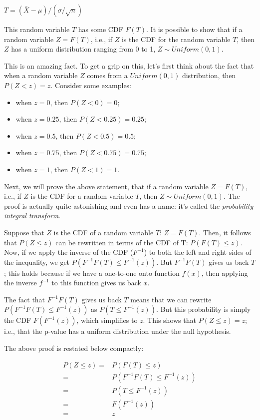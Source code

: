 \documentclass[12pt,]{krantz}
\providecommand{\tightlist}{%
  \setlength{\itemsep}{0pt}\setlength{\parskip}{0pt}}
\begin{document}
\(T=(\bar{X}-\mu)/(\sigma/\sqrt{n})\)

This random variable \(T\) has some CDF \(F(T)\). It is possible to show that if a random variable \(Z=F(T)\), i.e., if \(Z\) is the
CDF for the random variable \(T\), then \(Z\) has a uniform distribution ranging from 0 to 1, \(Z \sim Uniform(0,1)\).

This is an amazing fact. To get a grip on this, let's first think about the fact that when a random variable \(Z\) comes from a \(Uniform(0,1)\) distribution, then \(P(Z<z)=z\). Consider some examples:

\begin{itemize}
\tightlist
\item
  when \(z=0\), then \(P(Z<0)=0\);
\item
  when \(z=0.25\), then \(P(Z<0.25)=0.25\);
\item
  when \(z=0.5\), then \(P(Z<0.5)=0.5\);
\item
  when \(z=0.75\), then \(P(Z<0.75)=0.75\);
\item
  when \(z=1\), then \(P(Z<1)=1\).
\end{itemize}

Next, we will prove the above statement, that if a random variable \(Z=F(T)\), i.e., if \(Z\) is the
CDF for a random variable \(T\), then \(Z \sim Uniform(0,1)\).
The proof is actually quite astonishing and even has a name: it's called the \emph{probability integral transform}.

Suppose that \(Z\) is the CDF of a random variable \(T\): \(Z=F(T)\). Then, it follows that \(P(Z\leq z)\) can be rewritten in terms of the CDF of T: \(P(F(T)\leq z)\). Now, if we apply the inverse of the CDF (\(F^{-1}\)) to both the left and right sides of the inequality, we get \(P(F^{-1}F(T)\leq F^{-1}(z))\).
But \(F^{-1}F(T)\) gives us back \(T\); this holds because if we have a one-to-one onto function \(f(x)\), then applying the inverse \(f^{-1}\) to this function gives us back \(x\).

The fact that \(F^{-1}F(T)\) gives us back \(T\) means that we can rewrite \(P(F^{-1}F(T)\leq F^{-1}(z))\) as \(P(T\leq F^{-1}(z) )\). But this probability is simply the CDF \(F(F^{-1} (z))\), which simplifies to \(z\). This shows that \(P(Z\leq z) = z\); i.e., that the p-value has a uniform distribution under the null hypothesis.

The above proof is restated below compactly:

\begin{equation}
\begin{split}
P(Z\leq z) =& P(F(T)\leq z)\\
=& P(F^{-1}F(T)\leq F^{-1}(z))\\
=& P(T\leq F^{-1}(z) ) \\
=& F(F^{-1} (z))\\
=& z\\
\end{split}
\end{equation}
\end{document}
